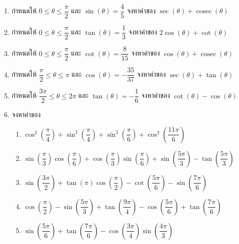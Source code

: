 \begin{enumerate}[label=\arabic*., leftmargin=*]
	\item กำหนดให้ $0 \leq \theta \leq \dfrac{\pi}{2}$ และ $\sin \left( \theta \right) = \dfrac{4}{5}$ จงหาค่าของ $\sec \left( \theta \right) + \operatorname{cosec} \left( \theta \right)$
	
	\item กำหนดให้ $0 \leq \theta \leq \dfrac{\pi}{2}$ และ $\tan \left( \theta \right) = \dfrac{1}{3}$ จงหาค่าของ $2 \cos \left( \theta \right) + \cot \left( \theta \right)$
	
	\item กำหนดให้ $0 \leq \theta \leq \dfrac{\pi}{2}$ และ $\cot \left( \theta \right) = \dfrac{8}{15}$ จงหาค่าของ $\cos \left( \theta \right) + \operatorname{cosec} \left( \theta \right)$
	
	\item กำหนดให้ $\dfrac{\pi}{2} \leq \theta \leq \pi$ และ $\cos \left( \theta \right) = -\dfrac{35}{37}$ จงหาค่าของ $\sec \left( \theta \right) + \tan \left( \theta \right)$
	
	\item กำหนดให้ $\dfrac{3\pi}{2} \leq \theta \leq 2\pi$ และ $\tan \left( \theta \right) = -\dfrac{1}{6}$ จงหาค่าของ $\cot \left( \theta \right) - \cos \left( \theta \right)$
	
	\item จงหาค่าของ
	\begin{enumerate}[label=\theenumi\arabic*), leftmargin=1.5em, itemsep=0.6em]
		\everymath{\displaystyle}
		\item $\cos^{2} \left( \dfrac{\pi}{4} \right) + \sin^{2} \left( \dfrac{\pi}{4} \right) + \sin^{2} \left( \dfrac{\pi}{6} \right) + \cos^{2} \left( \dfrac{11\pi}{6} \right)$
		\item $\sin \left( \dfrac{\pi}{3} \right) \cos \left( \dfrac{\pi}{6} \right) + \cos \left( \dfrac{\pi}{3} \right) \sin \left( \dfrac{\pi}{6} \right) + \sin \left( \dfrac{5\pi}{3} \right) - \tan \left( \dfrac{5\pi}{3} \right)$
		\item $\sin \left( \dfrac{3\pi}{2} \right) + \tan \left( \pi \right) \cos \left( \dfrac{\pi}{2} \right) - \cot \left( \dfrac{5\pi}{6} \right) - \sin \left( \dfrac{7\pi}{6} \right)$
		\item $\cos \left( \dfrac{\pi}{2} \right) - \sin \left( \dfrac{5\pi}{3} \right) + \tan \left( \dfrac{9\pi}{4} \right) - \cos \left( \dfrac{5\pi}{6} \right) + \tan \left( \dfrac{7\pi}{6} \right)$
		\item $\sin \left( \dfrac{5\pi}{6} \right) + \tan \left( \dfrac{7\pi}{6} \right) - \cos \left( \dfrac{3\pi}{4} \right) \sin \left( \dfrac{4\pi}{3} \right)$


\end{enumerate}
\end{enumerate}
